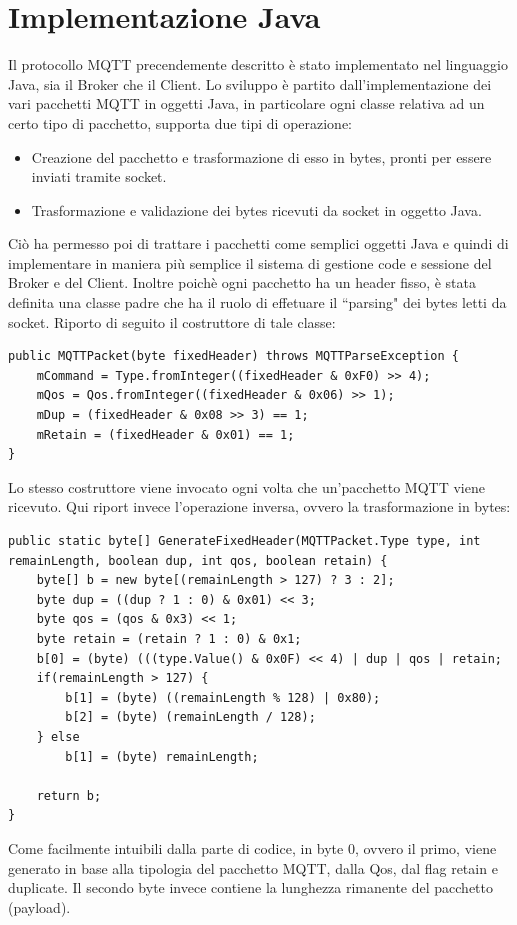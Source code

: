 \documentclass{article}
\begin{document}
\section{Implementazione Java}
Il protocollo MQTT precendemente descritto è stato implementato nel linguaggio Java, sia il Broker che il Client. Lo sviluppo è partito dall'implementazione dei vari pacchetti MQTT in oggetti Java, in particolare ogni classe relativa ad un certo tipo di pacchetto, supporta due tipi di operazione:
\begin{itemize}
	\item Creazione del pacchetto e trasformazione di esso in bytes, pronti per essere inviati tramite socket.
	\item Trasformazione e validazione dei bytes ricevuti da socket in oggetto Java.
\end{itemize}
Ciò ha permesso poi di trattare i pacchetti come semplici oggetti Java e quindi di implementare in maniera più semplice il sistema di gestione code e sessione del Broker e del Client. Inoltre poichè ogni pacchetto ha un header fisso, è stata definita una classe padre che ha il ruolo di effetuare il ``parsing" dei bytes letti da socket. Riporto di seguito il costruttore di tale classe:
\begin{lstlisting}[style=JavaStyle]
public MQTTPacket(byte fixedHeader) throws MQTTParseException {
	mCommand = Type.fromInteger((fixedHeader & 0xF0) >> 4);
	mQos = Qos.fromInteger((fixedHeader & 0x06) >> 1);
	mDup = (fixedHeader & 0x08 >> 3) == 1;
	mRetain = (fixedHeader & 0x01) == 1;
}
\end{lstlisting}
Lo stesso costruttore viene invocato ogni volta che un'pacchetto MQTT viene ricevuto. Qui riport invece l'operazione inversa, ovvero la trasformazione in bytes:
\begin{lstlisting}[style=JavaStyle]
public static byte[] GenerateFixedHeader(MQTTPacket.Type type, int remainLength, boolean dup, int qos, boolean retain) {
	byte[] b = new byte[(remainLength > 127) ? 3 : 2];
	byte dup = ((dup ? 1 : 0) & 0x01) << 3;
	byte qos = (qos & 0x3) << 1;
	byte retain = (retain ? 1 : 0) & 0x1;
	b[0] = (byte) (((type.Value() & 0x0F) << 4) | dup | qos | retain;
	if(remainLength > 127) {
		b[1] = (byte) ((remainLength % 128) | 0x80);
		b[2] = (byte) (remainLength / 128);
	} else
		b[1] = (byte) remainLength;
	
	return b;
}
\end{lstlisting}
Come facilmente intuibili dalla parte di codice, in byte 0, ovvero il primo, viene generato in base alla tipologia del pacchetto MQTT, dalla Qos, dal flag retain e duplicate. Il secondo byte invece contiene la lunghezza rimanente del pacchetto (payload).\\\\
\end{document}
